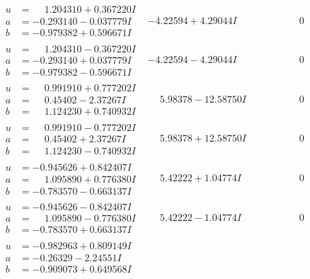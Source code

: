 \documentclass[1p]{elsarticle_modified}
\theoremstyle{definition}
\begin{document}
$$\begin{array}{c|c|c}
\begin{aligned}
u &= \phantom{-}1.204310 + 0.367220 I \\
a &= -0.293140 - 0.037779 I \\
b &= -0.979382 + 0.596671 I\end{aligned}
 & -4.22594 + 4.29044 I & \phantom{-0.000000 } 0 \\ \hline\begin{aligned}
u &= \phantom{-}1.204310 - 0.367220 I \\
a &= -0.293140 + 0.037779 I \\
b &= -0.979382 - 0.596671 I\end{aligned}
 & -4.22594 - 4.29044 I & \phantom{-0.000000 } 0 \\ \hline\begin{aligned}
u &= \phantom{-}0.991910 + 0.777202 I \\
a &= \phantom{-}0.45402 - 2.37267 I \\
b &= \phantom{-}1.124230 + 0.740932 I\end{aligned}
 & \phantom{-}5.98378 - 12.58750 I & \phantom{-0.000000 } 0 \\ \hline\begin{aligned}
u &= \phantom{-}0.991910 - 0.777202 I \\
a &= \phantom{-}0.45402 + 2.37267 I \\
b &= \phantom{-}1.124230 - 0.740932 I\end{aligned}
 & \phantom{-}5.98378 + 12.58750 I & \phantom{-0.000000 } 0 \\ \hline\begin{aligned}
u &= -0.945626 + 0.842407 I \\
a &= \phantom{-}1.095890 + 0.776380 I \\
b &= -0.783570 - 0.663137 I\end{aligned}
 & \phantom{-}5.42222 + 1.04774 I & \phantom{-0.000000 } 0 \\ \hline\begin{aligned}
u &= -0.945626 - 0.842407 I \\
a &= \phantom{-}1.095890 - 0.776380 I \\
b &= -0.783570 + 0.663137 I\end{aligned}
 & \phantom{-}5.42222 - 1.04774 I & \phantom{-0.000000 } 0 \\ \hline\begin{aligned}
u &= -0.982963 + 0.809149 I \\
a &= -0.26329 - 2.24551 I \\
b &= -0.909073 + 0.649568 I\end{aligned}

\end{array}$$
\end{document}
